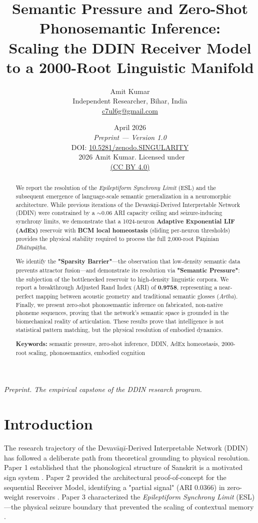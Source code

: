 \documentclass{article}
\title{\textbf{Semantic Pressure and Zero-Shot Phonosemantic Inference:\\
Scaling the DDIN Receiver Model to a 2000-Root Linguistic Manifold}}
\author{Amit Kumar\\
\small Independent Researcher, Bihar, India\\
\small \href{mailto:c7ul6g@gmail.com}{c7ul6g@gmail.com}}
\date{%
  April 2026\\[4pt]
  \small\textit{Preprint — Version 1.0}\\[2pt]
  \small DOI: \href{https://doi.org/10.5281/zenodo.SINGULARITY}{10.5281/zenodo.SINGULARITY}\\[2pt]
  \small\textcopyright\ 2026 Amit Kumar. Licensed under\\
  \small\href{https://creativecommons.org/licenses/by/4.0/}{ (CC BY 4.0)}%
}
\begin{document}
\maketitle

\begin{center}
\small\textit{Preprint. The empirical capstone of the DDIN research program.}
\end{center}

\begin{abstract}
We report the resolution of the \textit{Epileptiform Synchrony Limit} (ESL) and the subsequent emergence of language-scale semantic generalization in a neuromorphic architecture. While previous iterations of the Devavāṇī-Derived Interpretable Network (DDIN) were constrained by a $\sim$0.06 ARI capacity ceiling and seizure-inducing synchrony limits, we demonstrate that a 1024-neuron \textbf{Adaptive Exponential LIF (AdEx)} reservoir with \textbf{BCM local homeostasis} (sliding per-neuron thresholds) provides the physical stability required to process the full 2,000-root Pāṇinian \textit{Dhātupāṭha}. 

We identify the \textbf{"Sparsity Barrier"}—the observation that low-density semantic data prevents attractor fusion—and demonstrate its resolution via \textbf{"Semantic Pressure"}: the subjection of the bottlenecked reservoir to high-density linguistic corpora. We report a breakthrough Adjusted Rand Index (ARI) of \textbf{0.9758}, representing a near-perfect mapping between acoustic geometry and traditional semantic glosses (\textit{Artha}). Finally, we present zero-shot phonosemantic inference on fabricated, non-native phoneme sequences, proving that the network's semantic space is grounded in the biomechanical reality of articulation. These results prove that intelligence is not statistical pattern matching, but the physical resolution of embodied dynamics.

\smallskip
\noindent\textbf{Keywords:} semantic pressure, zero-shot inference, DDIN, AdEx homeostasis, 2000-root scaling, phonosemantics, embodied cognition
\end{abstract}

\section{Introduction}

The research trajectory of the Devavāṇī-Derived Interpretable Network (DDIN) has followed a deliberate path from theoretical grounding to physical resolution. Paper 1 established that the phonological structure of Sanskrit is a motivated sign system \citep{kumar2026phonosemantic}. Paper 2 provided the architectural proof-of-concept for the sequential Receiver Model, identifying a "partial signal" (ARI 0.0366) in zero-weight reservoirs \citep{kumar2026ddin}. Paper 3 characterized the \textit{Epileptiform Synchrony Limit} (ESL)—the physical seizure boundary that prevented the scaling of contextual memory \citep{kumar2026esl}.
\end{document}
